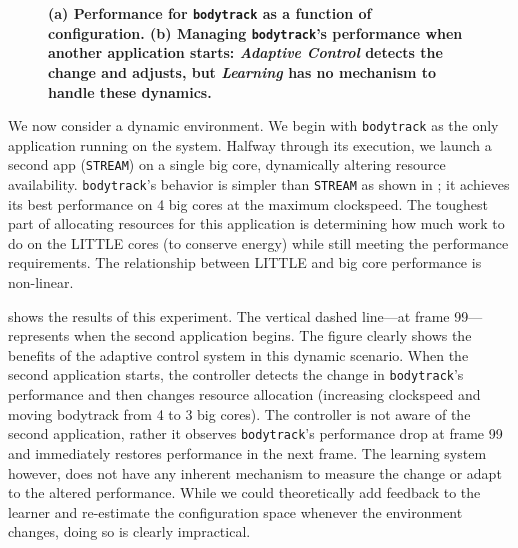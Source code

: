 \begin{figure}
\centering
  \subfloat[]
  {
    
    \label{fig:BODYTRACK_timeline}    
  }
  \caption{\small \bf (a) Performance for \texttt{bodytrack} as a
    function of configuration. (b) Managing \texttt{bodytrack}'s
    performance when another application starts: \emph{Adaptive
      Control} detects the change and adjusts, but \emph{Learning} has
    no mechanism to handle these dynamics. }
  \label{fig:control}
\end{figure}


We now consider a dynamic environment.  We begin with
\texttt{bodytrack} as the only application running on the system.
Halfway through its execution, we launch a second app
(\texttt{STREAM}) on a single big core, dynamically altering resource
availability. \texttt{bodytrack}'s behavior is simpler than
\texttt{STREAM} as shown in ; it
achieves its best performance on 4 big cores at the maximum
clockspeed.  The toughest part of allocating resources for this
application is determining how much work to do on the LITTLE cores (to
conserve energy) while still meeting the performance requirements.
The relationship between LITTLE and big core performance is
non-linear.

 shows the results of this experiment.  The
vertical dashed line---at frame 99---represents when the second
application begins.  The figure clearly shows the benefits of the
adaptive control system in this dynamic scenario.  When the second
application starts, the controller detects the change in \texttt{bodytrack}'s
performance and then changes resource allocation (increasing
clockspeed and moving bodytrack from 4 to 3 big cores).  The
controller is not aware of the second application, rather it observes
\texttt{bodytrack}'s performance drop at frame 99 and immediately
restores performance in the next frame. The learning system however,
does not have any inherent mechanism to measure the change or adapt to
the altered performance.  While we could theoretically add feedback to
the learner and re-estimate the configuration space whenever the
environment changes, doing so is clearly impractical.

